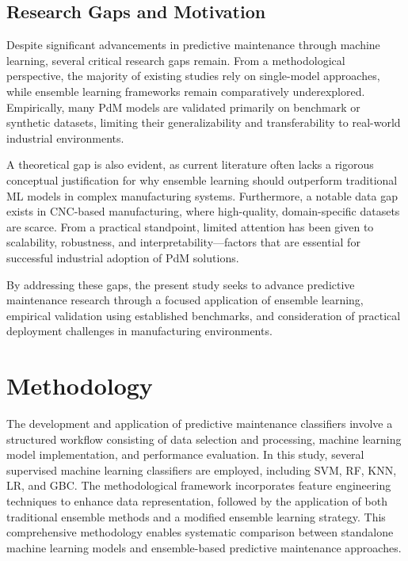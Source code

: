 \documentclass[final,5p, twocolumn]{elsarticle}
\begin{document}
\subsection{Research Gaps and Motivation}

Despite significant advancements in predictive maintenance through machine learning, several critical research gaps remain. From a methodological perspective, the majority of existing studies rely on single-model approaches, while ensemble learning frameworks remain comparatively underexplored. Empirically, many PdM models are validated primarily on benchmark or synthetic datasets, limiting their generalizability and transferability to real-world industrial environments.

A theoretical gap is also evident, as current literature often lacks a rigorous conceptual justification for why ensemble learning should outperform traditional ML models in complex manufacturing systems. Furthermore, a notable data gap exists in CNC-based manufacturing, where high-quality, domain-specific datasets are scarce. From a practical standpoint, limited attention has been given to scalability, robustness, and interpretability—factors that are essential for successful industrial adoption of PdM solutions.

By addressing these gaps, the present study seeks to advance predictive maintenance research through a focused application of ensemble learning, empirical validation using established benchmarks, and consideration of practical deployment challenges in manufacturing environments.

\section{Methodology}

The development and application of predictive maintenance classifiers involve a structured workflow consisting of data selection and processing, machine learning model implementation, and performance evaluation. In this study, several supervised machine learning classifiers are employed, including SVM, RF, KNN, LR, and GBC. The methodological framework incorporates feature engineering techniques to enhance data representation, followed by the application of both traditional ensemble methods and a modified ensemble learning strategy. This comprehensive methodology enables systematic comparison between standalone machine learning models and ensemble-based predictive maintenance approaches.
\end{document}
